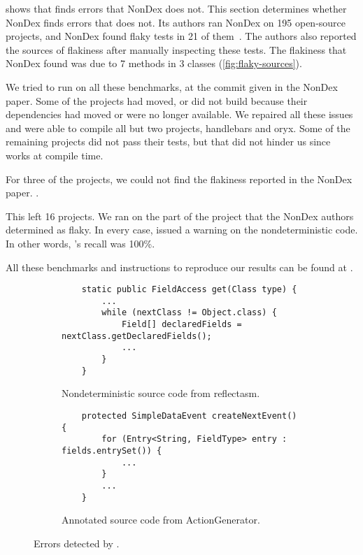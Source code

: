 shows that \theDeterminismChecker finds errors that NonDex does not.
This section determines whether NonDex finds errors that \theDeterminismChecker does not.
Its authors ran NonDex on 195 open-source projects, and NonDex found flaky tests in
21 of them~\cite{nondex}.
The authors also reported the sources of flakiness
after manually inspecting these tests. 
The flakiness that NonDex found was due to 7 methods in 3 classes (\cref{fig:flaky-sources}).

We tried to run \theDeterminismChecker on all these benchmarks, at the
commit given in the NonDex paper.
Some of the projects had moved, or did not build because their dependencies
had moved or were no longer available.  We repaired all these issues and
were able to compile all but two
projects, handlebars and oryx.  Some of the remaining projects did not pass
their tests, but that did not hinder us since \theDeterminismChecker works
at compile time.

For three of the projects, we could not find the flakiness reported in the
NonDex paper.
.

This left 16 projects.  We ran \theDeterminismChecker on the part of the
project that the NonDex authors determined as flaky.  In every case,
\theDeterminismChecker issued a warning on the nondeterministic code.  In
other words, \theDeterminismChecker's recall was 100\%.

All these benchmarks and instructions to reproduce our results can be found at .


\begin{figure}
    \centering
    \begin{subfigure}[b]{0.95\textwidth}
        \begin{verbatim}
    static public FieldAccess get(Class type) {
        ...
        while (nextClass != Object.class) {
            Field[] declaredFields = nextClass.getDeclaredFields();
            ...
        }
    }
        \end{verbatim}
        \caption{Nondeterministic source code from reflectasm.}
        \label{code-reflectasm}
    \end{subfigure}

    \begin{subfigure}[b]{0.95\textwidth}
        \begin{verbatim}
    protected SimpleDataEvent createNextEvent() {
        for (Entry<String, FieldType> entry : fields.entrySet()) {
            ...
        }
        ...
    }
        \end{verbatim}
        \caption{Annotated source code from ActionGenerator.}
        \label{code-actiongenerator}
    \end{subfigure}    
    \caption{Errors detected by \TheDeterminismChecker.}
    \label{fig:nondex-source}
\end{figure}


